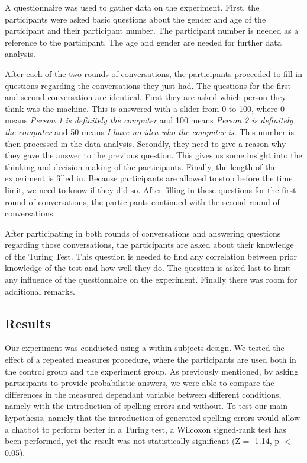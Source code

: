 A questionnaire was used to gather data on the experiment. First, the participants were asked basic questions about the gender and age of the participant and their participant number. The participant number is needed as a reference to the participant. The age and gender are needed for further data analysis.

After each of the two rounds of conversations, the participants proceeded to fill in questions regarding the conversations they just had. The questions for the first and second conversation are identical. First they are asked which person they think was the machine. This is answered with a slider from 0 to 100, where 0 means \textit{Person 1 is definitely the computer} and 100 means \textit{Person 2 is definitely the computer} and 50 means \textit{I have no idea who the computer is.} This number is then processed in the data analysis. Secondly, they need to give a reason why they gave the answer to the previous question. This gives us some insight into the thinking and decision making of the participants. Finally, the length of the experiment is filled in. Because participants are allowed to stop before the time limit, we need to know if they did so. After filling in these questions for the first round of conversations, the participants continued with the second round of conversations.

After participating in both rounds of conversations and answering questions regarding those conversations, the participants are asked about their knowledge of the Turing Test. This question is needed to find any correlation between prior knowledge of the test and how well they do. The question is asked last to limit any influence of the questionnaire on the experiment. Finally there was room for additional remarks.


\subsection{Results}
Our experiment was conducted using a within-subjects design. We tested the effect of a repeated measures procedure, where the participants are used both in the control group and the experiment group. As previously mentioned, by asking participants to provide probabilistic answers, we were able to compare the differences in the measured dependant variable between different conditions, namely with the introduction of spelling errors and without. To test our main hypothesis, namely that the introduction of generated spelling errors would allow a chatbot to perform better in a Turing test, a Wilcoxon signed-rank test has been performed, yet the result was not statistically significant (Z = -1.14, p $<$ 0.05).

